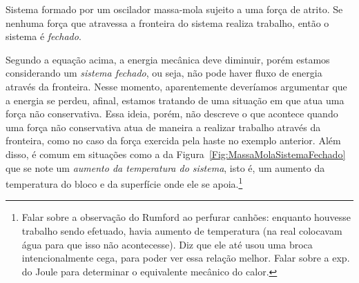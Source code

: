 \begin{marginfigure}
\centering
{}
\caption{Sistema formado por um oscilador massa-mola sujeito a uma força de atrito. Se nenhuma força que atravessa a fronteira do sistema realiza trabalho, então o sistema é \emph{fechado}.\label{Fig:MassaMolaSistemaFechado}}
\end{marginfigure}

Segundo a equação acima, a energia mecânica deve diminuir, porém estamos considerando um \emph{sistema fechado}, ou seja, não pode haver fluxo de energia através da fronteira. Nesse momento, aparentemente deveríamos argumentar que a energia se perdeu, afinal, estamos tratando de uma situação em que atua uma força não conservativa. Essa ideia, porém, não descreve o que acontece quando uma força não conservativa atua de maneira a realizar trabalho através da fronteira, como no caso da força exercida pela haste no exemplo anterior. Além disso, é comum em situações como a da Figura~\ref{Fig:MassaMolaSistemaFechado} que se note um \emph{aumento da temperatura do sistema}, isto é, um aumento da temperatura do bloco e da superfície onde ele se apoia.\footnote{\textrm{Falar sobre a observação do Rumford ao perfurar canhões: enquanto houvesse trabalho sendo efetuado, havia aumento de temperatura (na real colocavam água para que isso não acontecesse). Diz que ele até usou uma broca intencionalmente cega, para poder ver essa relação melhor. Falar sobre a exp. do Joule para determinar o equivalente mecânico do calor.}}


